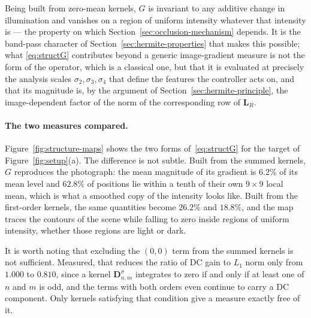 Being built from zero-mean kernels, $G$ is invariant to any additive change
in illumination and vanishes on a region of uniform intensity whatever that
intensity is --- the property on which Section~\ref{sec:occlusion-mechanism}
depends. It is the band-pass character of
Section~\ref{sec:hermite-properties} that makes this possible; what
\eqref{eq:structG} contributes beyond a generic image-gradient measure is not
the form of the operator, which is a classical one, but that it is evaluated
at precisely the analysis scales $\sigma_{2},\sigma_{3},\sigma_{4}$ that
define the features the controller acts on, and that its magnitude is, by the
argument of Section~\ref{sec:hermite-principle}, the image-dependent factor
of the norm of the corresponding row of $\mathbf{L}_{R}$.

\paragraph{The two measures compared.}
Figure~\ref{fig:structure-maps} shows the two forms of~\eqref{eq:structG} for
the target of Figure~\ref{fig:setup}(a). The difference is not subtle. Built
from the summed kernels, $G$ reproduces the photograph: the mean magnitude of
its gradient is $6.2\%$ of its mean level and $62.8\%$ of positions lie
within a tenth of their own $9\times9$ local mean, which is what a smoothed
copy of the intensity looks like. Built from the first-order kernels, the same
quantities become $26.2\%$ and $18.8\%$, and the map traces the contours of
the scene while falling to zero inside regions of uniform intensity, whether
those regions are light or dark.

It is worth noting that excluding the $(0,0)$ term from the summed kernels is
not sufficient. Measured, that reduces the ratio of DC gain to $L_{1}$ norm
only from $1.000$ to $0.810$, since a kernel $\mathbf{D}_{n,m}^{\sigma}$
integrates to zero if and only if at least one of $n$ and $m$ is odd, and the
terms with both orders even continue to carry a DC component. Only kernels
satisfying that condition give a measure exactly free of it.

